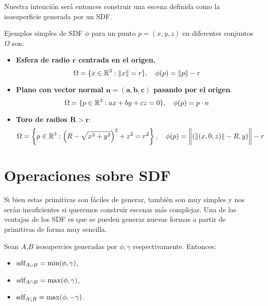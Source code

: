 Nuestra intención será entonces construir una escena definida como la isosuperficie generada por un SDF.

\begin{ejemplo}
    Ejemplos simples de SDF $\phi$ para un punto $p=(x,y,z)$ en diferentes conjuntos $\Omega$ son:
    \begin{itemize}
        \item \textbf{Esfera de radio $\boldsymbol{r}$ centrada en el origen.}
        \begin{equation*}
            \Omega=\{x\in \mathbb{R}^3 : \Vert x\Vert = r\},\quad \phi(p) = \Vert p\Vert - r
        \end{equation*}
        \item \textbf{Plano con vector normal $\boldsymbol{n=(a,b,c)}$ pasando por el origen}.
        \begin{equation*}
            \Omega=\{p\in\mathbb{R}^3 : ax+by+cz = 0\},\quad \phi(p) = p\cdot n
        \end{equation*}
        \item \textbf{Toro de radios $\boldsymbol{R>r}$}:
        \begin{equation*}
            \Omega=\left\{p\in \mathbb{R}^3 : \left(R-\sqrt{x^2+y^2}\right)^2 + z^2 = r^2\right\},\quad \phi(p)= \bigg\Vert (\Vert(x,0,z)\Vert - R, y) \bigg\Vert - r
        \end{equation*}
    \end{itemize}
\end{ejemplo}

\section{Operaciones sobre SDF}
Si bien estas primitivas son fáciles de generar, también son muy simples y nos serán insuficientes si queremos construir escenas más complejas. Una de las ventajas de los SDF es que se pueden generar nuevas formas a partir de primitivas de forma muy sencilla.

\begin{proposicion}
    Sean $A$,$B$ isosupercies generadas por $\phi,\gamma$ respectivamente. Entonces:
    \begin{itemize}
        \item $\text{sdf}_{A\cup B} = \min(\phi, \gamma)$,
        \item $\text{sdf}_{A\cap B} = \max(\phi, \gamma)$,
        \item $\text{sdf}_{A\setminus B} = \max(\phi, -\gamma)$.
    \end{itemize}
\end{proposicion}

